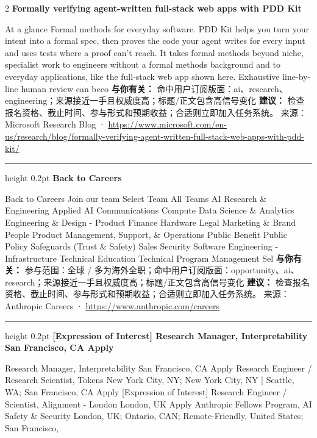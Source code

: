 \documentclass[10.5pt]{ctexart}
\begin{document}
\begin{multicols}{2}
{\large\bfseries Formally verifying agent-written full-stack web apps with PDD Kit}\par
At a glance Formal methods for everyday software. PDD Kit helps you turn your intent into a formal spec, then proves the code your agent writes for every input and uses tests where a proof can’t reach. It takes formal methods beyond niche, specialist work to engineers without a formal methods background and to everyday applications, like the full-stack web app shown here. Exhaustive line-by-line human review can beco
\textbf{与你有关：} 命中用户订阅版面：ai、research、engineering；来源接近一手且权威度高；标题/正文包含高信号变化
\textbf{建议：} 检查报名资格、截止时间、参与形式和预期收益；合适则立即加入任务系统。
{\footnotesize\color{ormuted} 来源：Microsoft Research Blog · \url{https://www.microsoft.com/en-us/research/blog/formally-verifying-agent-written-full-stack-web-apps-with-pdd-kit/}}
\vspace{2mm}
\hrule height 0.2pt
\vspace{2mm}
{\large\bfseries Back to Careers}\par
Back to Careers Join our team Select Team All Teams AI Research \& Engineering Applied AI Communications Compute Data Science \& Analytics Engineering \& Design - Product Finance Hardware Legal Marketing \& Brand People Product Management, Support, \& Operations Public Benefit Public Policy Safeguards (Trust \& Safety) Sales Security Software Engineering - Infrastructure Technical Education Technical Program Management Sel
\textbf{与你有关：} 参与范围：全球 / 多为海外全职；命中用户订阅版面：opportunity、ai、research；来源接近一手且权威度高；标题/正文包含高信号变化
\textbf{建议：} 检查报名资格、截止时间、参与形式和预期收益；合适则立即加入任务系统。
{\footnotesize\color{ormuted} 来源：Anthropic Careers · \url{https://www.anthropic.com/careers}}
\vspace{2mm}
\hrule height 0.2pt
\vspace{2mm}
{\large\bfseries [Expression of Interest] Research Manager, Interpretability San Francisco, CA Apply}\par
[Expression of Interest] Research Manager, Interpretability San Francisco, CA Apply Research Engineer / Research Scientist, Tokens New York City, NY; New York City, NY | Seattle, WA; San Francisco, CA Apply [Expression of Interest] Research Engineer / Scientist, Alignment - London London, UK Apply Anthropic Fellows Program, AI Safety \& Security London, UK; Ontario, CAN; Remote-Friendly, United States; San Francisco, 

\end{multicols}
\end{document}

